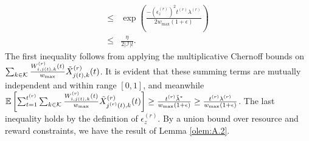 \documentclass[letterpaper, 10 pt, conference]{ieeeconf}  %
\makeatletter
\renewenvironment{proof}[1][\relax]{\par
  \pushQED{\qed}%
  \normalfont \topsep6\p@\@plus6\p@\relax
  \trivlist
  \item[\hskip\labelsep\itshape
    \ifx#1\relax \proofname\else\proofname{} of #1\fi\@addpunct{.}]\ignorespaces
}{%
  \popQED\endtrivlist\@endpefalse
}
\newcommand{\III}{\mathcal{I}}
\newcommand{\KKK}{\mathcal{K}}
\theoremstyle{plain}
\theoremstyle{definition}
\theoremstyle{remark}
\makeatother
\begin{document}
\begin{proof}[Lemma \ref{olem:A.2}]
\begin{subequations}
\begin{alignat}{2}
\leq & \exp\left(\frac{-\left(\epsilon^{(r)}_{z}\right)^2 t^{(r)} \lambda^{(r)}}{2w_{\max} \left(1+\epsilon\right)}\right) \nonumber \\
\leq & \frac{\eta}{2|\III|l} \nonumber.
\end{alignat}
\end{subequations}
The first inequality follows from applying the multiplicative Chernoff bounds on $\sum_{k \in \KKK} \frac{W^{(r)}_{i,j(t),k}(t)}{w_{\max}} \Tilde{X}^{(r)}_{j(t),k}(t)$. It is evident that these summing terms are mutually independent and within range $[0,1]$, and meanwhile $\mathbb{E}\left[\sum^{t^{(r)}}_{t=1} \sum_{k \in \KKK} \frac{W^{(r)}_{i,j(t),k}(t)}{w_{\max}} \Tilde{X}^{(r)}_{j^{(r)}(t),k}(t)\right] \geq \frac{t^{(r)} \Tilde{\lambda}^*}{w_{\max} (1+\epsilon)} \geq \frac{t^{(r)} \lambda^{(r)}}{w_{\max} (1+\epsilon)}$. The last inequality holds by the definition of $\epsilon^{(r)}_{z}$. By a union bound over resource and reward constraints, we have the result of Lemma \ref{olem:A.2}.
\end{proof}
\end{document}
